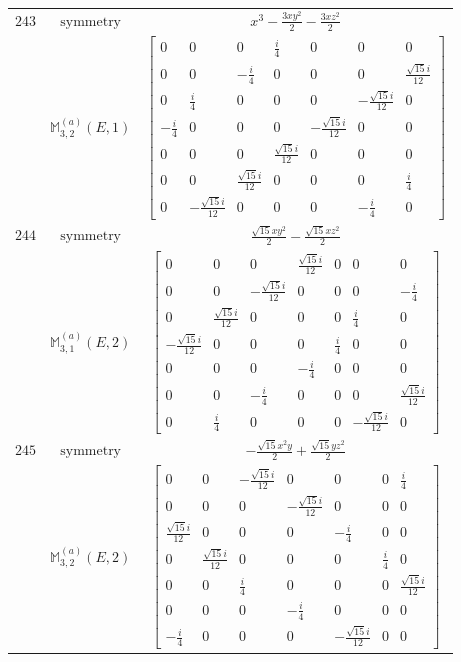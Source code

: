 \documentclass[fleqn,8pt,landscape]{jsarticle}
\begin{document}
\begin{longtable}{ccc}
$ 243 $ & $ \text{symmetry} $ & $ x^{3} - \frac{3 x y^{2}}{2} - \frac{3 x z^{2}}{2} $ \\
$  $ & $ \mathbb{M}_{3,2}^{(a)}(E,1) $ & $ \begin{bmatrix} 0 & 0 & 0 & \frac{i}{4} & 0 & 0 & 0 \\ 0 & 0 & - \frac{i}{4} & 0 & 0 & 0 & \frac{\sqrt{15} i}{12} \\ 0 & \frac{i}{4} & 0 & 0 & 0 & - \frac{\sqrt{15} i}{12} & 0 \\ - \frac{i}{4} & 0 & 0 & 0 & - \frac{\sqrt{15} i}{12} & 0 & 0 \\ 0 & 0 & 0 & \frac{\sqrt{15} i}{12} & 0 & 0 & 0 \\ 0 & 0 & \frac{\sqrt{15} i}{12} & 0 & 0 & 0 & \frac{i}{4} \\ 0 & - \frac{\sqrt{15} i}{12} & 0 & 0 & 0 & - \frac{i}{4} & 0 \end{bmatrix} $ \\ \hline
$ 244 $ & $ \text{symmetry} $ & $ \frac{\sqrt{15} x y^{2}}{2} - \frac{\sqrt{15} x z^{2}}{2} $ \\
$  $ & $ \mathbb{M}_{3,1}^{(a)}(E,2) $ & $ \begin{bmatrix} 0 & 0 & 0 & \frac{\sqrt{15} i}{12} & 0 & 0 & 0 \\ 0 & 0 & - \frac{\sqrt{15} i}{12} & 0 & 0 & 0 & - \frac{i}{4} \\ 0 & \frac{\sqrt{15} i}{12} & 0 & 0 & 0 & \frac{i}{4} & 0 \\ - \frac{\sqrt{15} i}{12} & 0 & 0 & 0 & \frac{i}{4} & 0 & 0 \\ 0 & 0 & 0 & - \frac{i}{4} & 0 & 0 & 0 \\ 0 & 0 & - \frac{i}{4} & 0 & 0 & 0 & \frac{\sqrt{15} i}{12} \\ 0 & \frac{i}{4} & 0 & 0 & 0 & - \frac{\sqrt{15} i}{12} & 0 \end{bmatrix} $ \\ \hline
$ 245 $ & $ \text{symmetry} $ & $ - \frac{\sqrt{15} x^{2} y}{2} + \frac{\sqrt{15} y z^{2}}{2} $ \\
$  $ & $ \mathbb{M}_{3,2}^{(a)}(E,2) $ & $ \begin{bmatrix} 0 & 0 & - \frac{\sqrt{15} i}{12} & 0 & 0 & 0 & \frac{i}{4} \\ 0 & 0 & 0 & - \frac{\sqrt{15} i}{12} & 0 & 0 & 0 \\ \frac{\sqrt{15} i}{12} & 0 & 0 & 0 & - \frac{i}{4} & 0 & 0 \\ 0 & \frac{\sqrt{15} i}{12} & 0 & 0 & 0 & \frac{i}{4} & 0 \\ 0 & 0 & \frac{i}{4} & 0 & 0 & 0 & \frac{\sqrt{15} i}{12} \\ 0 & 0 & 0 & - \frac{i}{4} & 0 & 0 & 0 \\ - \frac{i}{4} & 0 & 0 & 0 & - \frac{\sqrt{15} i}{12} & 0 & 0 \end{bmatrix} $ \\ \hline

\end{longtable}
\end{document}
